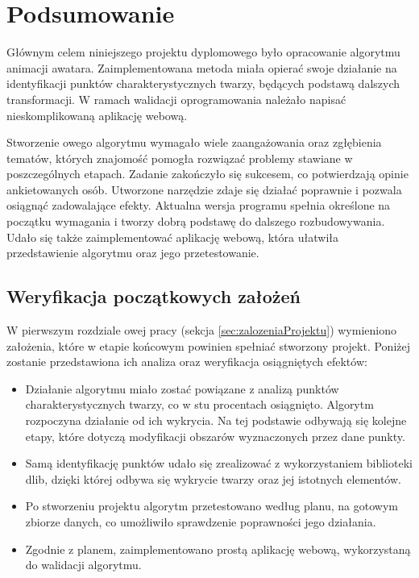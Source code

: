 \chapter{Podsumowanie}
\label{cha:podsumowanie}
Głównym celem niniejszego projektu dyplomowego było opracowanie algorytmu animacji awatara. Zaimplementowana metoda miała opierać swoje działanie na identyfikacji punktów charakterystycznych twarzy, będących podstawą dalszych transformacji. W ramach walidacji oprogramowania należało napisać nieskomplikowaną aplikację webową.

Stworzenie owego algorytmu wymagało wiele zaangażowania oraz zgłębienia tematów, których znajomość pomogła rozwiązać problemy stawiane w poszczególnych etapach. Zadanie zakończyło się sukcesem, co potwierdzają opinie ankietowanych osób.  Utworzone narzędzie zdaje się działać poprawnie i pozwala osiągnąć zadowalające efekty. Aktualna wersja programu spełnia określone na początku wymagania i tworzy dobrą podstawę do dalszego rozbudowywania. Udało się także zaimplementować aplikację webową, która ułatwiła przedstawienie algorytmu oraz jego przetestowanie. 


\section{Weryfikacja początkowych założeń}
W pierwszym rozdziale owej pracy (sekcja \ref{sec:zalozeniaProjektu}) wymieniono założenia, które w etapie końcowym powinien spełniać stworzony projekt. Poniżej zostanie przedstawiona ich analiza oraz weryfikacja osiągniętych efektów:

\begin{itemize}
    \item Działanie algorytmu miało zostać powiązane z analizą punktów charakterystycznych twarzy, co w stu procentach osiągnięto. Algorytm rozpoczyna działanie od ich wykrycia. Na tej podstawie odbywają się kolejne etapy, które dotyczą modyfikacji obszarów wyznaczonych przez dane punkty.
    \item Samą identyfikację punktów udało się zrealizować z wykorzystaniem biblioteki dlib, dzięki której odbywa się wykrycie twarzy oraz jej istotnych elementów. 
    \item Po stworzeniu projektu algorytm przetestowano według planu, na gotowym zbiorze danych, co umożliwiło sprawdzenie poprawności jego działania.
    \item Zgodnie z planem, zaimplementowano prostą aplikację webową, wykorzystaną do walidacji algorytmu. %
\end{itemize}


